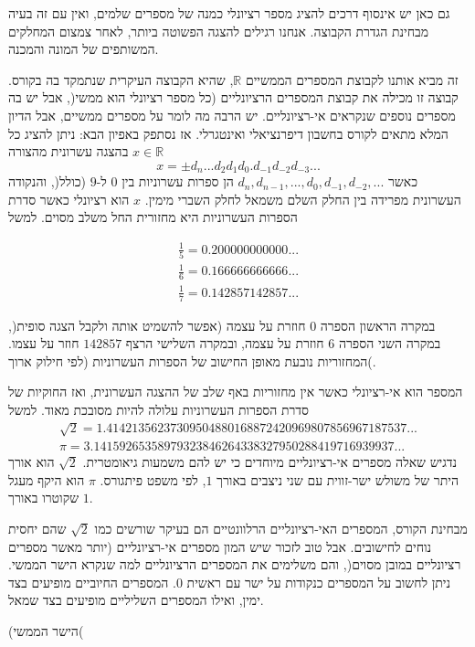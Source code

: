 \documentclass[
  hebrew,
  12pt,
  a4paper,
  oneside]{book}
\theoremstyle{definition}
\theoremstyle{remark}
\theoremstyle{plain}
\theoremstyle{remark}
\begin{document}
גם כאן יש אינסוף דרכים להציג מספר רציונלי כמנה של מספרים שלמים, ואין עם
זה בעיה מבחינת הגדרת הקבוצה. אנחנו רגילים להצגה הפשוטה ביותר, לאחר צמצום
המחלקים המשותפים של המונה והמכנה.

זה מביא אותנו לקבוצת המספרים הממשיים \(\mathbb{R}\), שהיא הקבוצה העיקרית
שנתמקד בה בקורס. קבוצה זו מכילה את קבוצת המספרים הרציונליים (כל מספר
רציונלי הוא ממשי(, אבל יש בה מספרים נוספים שנקראים אי-רציונליים. יש הרבה
מה לומר על מספרים ממשיים, אבל הדיון המלא מתאים לקורס בחשבון דיפרנציאלי
ואינטגרלי. אז נסתפק באפיון הבא: ניתן להציג כל \(x\in\mathbb{R}\) בהצגה
עשרונית מהצורה \[x=\pm d_{n}...d_{2}d_{1}d_{0}.d_{-1}d_{-2}d_{-3}...\]
כאשר \(d_{n},d_{n-1},...,d_{0},d_{-1},d_{-2},...\) הן ספרות עשרוניות בין
\(0\) ל-\(9\) (כולל(, והנקודה העשרונית מפרידה בין החלק השלם משמאל לחלק
השברי מימין. \(x\) הוא רציונלי כאשר סדרת הספרות העשרוניות היא מחזורית
החל משלב מסוים. למשל

\[\begin{aligned}
\frac{1}{5}=0.200000000000...\\
\frac{1}{6}=0.166666666666...\\
\frac{1}{7}=0.142857142857...
\end{aligned}\]

במקרה הראשון הספרה \(0\) חוזרת על עצמה (אפשר להשמיט אותה ולקבל הצגה
סופית(, במקרה השני הספרה \(6\) חוזרת על עצמה, ובמקרה השלישי הרצף
\(142857\) חוזר על עצמו. המחזוריות נובעת מאופן החישוב של הספרות
העשרוניות (לפי חילוק ארוך(.

המספר הוא אי-רציונלי כאשר אין מחזוריות באף שלב של ההצגה העשרונית, ואז
החוקיות של סדרת הספרות העשרוניות עלולה להיות מסובכת מאוד. למשל
\[\begin{aligned}
\sqrt{2}=1.41421356237309504880168872420969807856967187537...\\
\pi=3.14159265358979323846264338327950288419716939937...
\end{aligned}\] נדגיש שאלה מספרים אי-רציונליים מיוחדים כי יש להם משמעות
גיאומטרית. \(\sqrt{2}\) הוא אורך היתר של משולש ישר-זווית עם שני ניצבים
באורך \(1\), לפי משפט פיתגורס. \(\pi\) הוא היקף מעגל שקוטרו באורך \(1\).

מבחינת הקורס, המספרים האי-רציונליים הרלוונטיים הם בעיקר שורשים כמו
\(\sqrt{2}\) שהם יחסית נוחים לחישובים. אבל טוב לזכור שיש המון מספרים
אי-רציונליים (יותר מאשר מספרים רציונליים במובן מסוים(, והם משלימים את
המספרים הרציונליים למה שנקרא הישר הממשי. ניתן לחשוב על המספרים כנקודות
על ישר עם ראשית \(0\). המספרים החיוביים מופיעים בצד ימין, ואילו המספרים
השליליים מופיעים בצד שמאל.

(הישר הממשי(
\end{document}
